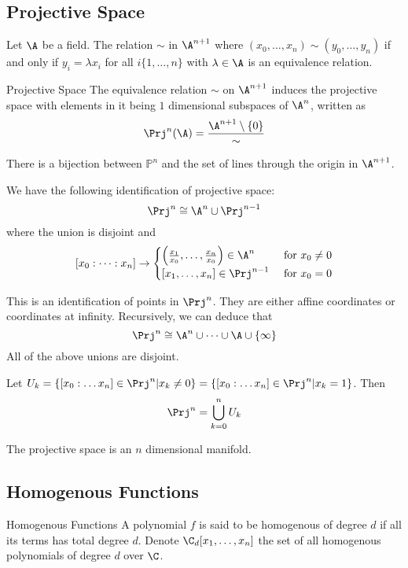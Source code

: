 \documentclass[a4paper]{article}
\begin{document}
\subsection{Projective Space}
\begin{lmm}{}{} Let $\A$ be a field. The relation $\sim$ in $\A^{n+1}$ where $(x_0,\dots,x_n)\sim(y_0,\dots,y_n)$ if and only if $y_i=\lambda x_i$ for all $i\{1,\dots,n\}$ with $\lambda\in\A$ is an equivalence relation. 
\end{lmm}

\begin{defn}{Projective Space}{} The equivalence relation $\sim$ on $\A^{n+1}$ induces the projective space with elements in it being $1$ dimensional subspaces of $\A^n$, written as $$\Prj^n(\A)=\frac{\A^{n+1}\setminus\{0\}}{\sim}$$
\end{defn}

\begin{prp}{}{} There is a bijection between $\mathbb{P}^n$ and the set of lines through the origin in $\A^{n+1}$. 
\end{prp}

\begin{prp}{}{} We have the following identification of projective space: $$\Prj^n\cong\A^n\cup\Prj^{n-1}$$ where the union is disjoint and  $$[x_0:\dots:x_n]\to\begin{cases}
\left(\frac{x_1}{x_0},\dots,\frac{x_n}{x_0}\right)\in\A^n & \text{ for } x_0\neq0\\
[x_1,\dots,x_n]\in\Prj^{n-1} & \text{ for } x_0=0
\end{cases}$$
\end{prp}

This is an identification of points in $\Prj^n$. They are either affine coordinates or coordinates at infinity. Recursively, we can deduce that $$\Prj^n\cong\A^n\cup\dots\cup\A\cup\{\infty\}$$ All of the above unions are disjoint. 

\begin{prp}{}{} Let $U_k=\{[x_0:\dots x_n]\in\Prj^n|x_k\neq0\}=\{[x_0:\dots x_n]\in\Prj^n|x_k=1\}$. Then $$\Prj^n=\bigcup_{k=0}^nU_k$$
\end{prp}

\begin{prp}{}{} The projective space is an $n$ dimensional manifold. 
\end{prp}

\subsection{Homogenous Functions}
\begin{defn}{Homogenous Functions}{} A polynomial $f$ is said to be homogenous of degree $d$ if all its terms has total degree $d$. Denote $\C_d[x_1,\dots,x_n]$ the set of all homogenous polynomials of degree $d$ over $\C$. 
\end{defn}
\end{document}
